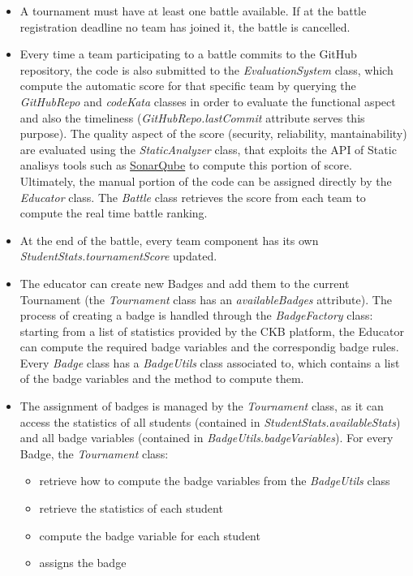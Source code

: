 \documentclass[a4paper, 11pt, titlepage]{article}
\begin{document}
\begin{itemize}
    \item A tournament must have at least one battle available. If at the battle registration deadline no team has joined it, the battle is cancelled.

    \item Every time a team participating to a battle commits to the GitHub repository, the code is also submitted to the \emph{EvaluationSystem} class, which compute the automatic score for that specific team by querying the \emph{GitHubRepo} and \emph{codeKata} classes in order to evaluate the functional aspect and also the timeliness (\emph{GitHubRepo.lastCommit} attribute serves this purpose). The quality aspect of the score (security, reliability, mantainability) are evaluated using the \emph{StaticAnalyzer} class, that exploits the API of Static analisys tools such as \href{https://www.sonarsource.com/products/sonarqube/}{SonarQube} to compute this portion of score. Ultimately, the manual portion of the code can be assigned directly by the \emph{Educator} class. The \emph{Battle} class retrieves the score from each team to compute the real time battle ranking.
    
    \item At the end of the battle, every team component has its own \emph{StudentStats.tournamentScore} updated.

    \item The educator can create new Badges and add them to the current Tournament (the \emph{Tournament} class has an \emph{availableBadges} attribute). The process of creating a badge is handled through the \emph{BadgeFactory} class: starting from a list of statistics provided by the CKB platform, the Educator can compute the required badge variables and the correspondig badge rules. Every \emph{Badge} class has a \emph{BadgeUtils} class associated to, which contains a list of the badge variables and the method to compute them. 
    
    \item The assignment of badges is managed by the \emph{Tournament} class, as it can access the statistics of all students (contained in \emph{StudentStats.availableStats}) and all badge variables (contained in \emph{BadgeUtils.badgeVariables}). For every Badge, the \emph{Tournament} class:
    \begin{itemize}    
        \item retrieve how to compute the badge variables from the \emph{BadgeUtils} class
        \item retrieve the statistics of each student
        \item compute the badge variable for each student
        \item assigns the badge
    \end{itemize}
\end{itemize}
\end{document}
